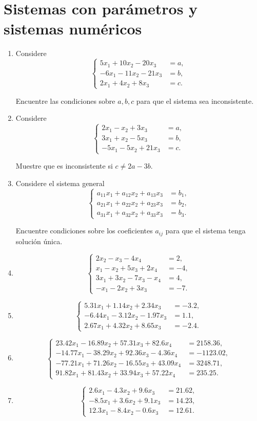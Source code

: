 \documentclass[12pt]{article}
\newcommand{\sistema}[1]{%
\[
\left\{
\begin{aligned}
#1
\end{aligned}
\right.
\]
}
\begin{document}
\section{Sistemas con parámetros y sistemas numéricos}

\begin{enumerate}[label=\textbf{\arabic*.},start=55,leftmargin=*]

\item Considere
\sistema{
5x_1+10x_2-20x_3&=a,\\
-6x_1-11x_2-21x_3&=b,\\
2x_1+4x_2+8x_3&=c.
}
Encuentre las condiciones sobre $a,b,c$ para que el sistema sea inconsistente.

\item Considere
\sistema{
2x_1-x_2+3x_3&=a,\\
3x_1+x_2-5x_3&=b,\\
-5x_1-5x_2+21x_3&=c.
}
Muestre que es inconsistente si $c\neq 2a-3b$.

\item Considere el sistema general
\sistema{
a_{11}x_1+a_{12}x_2+a_{13}x_3&=b_1,\\
a_{21}x_1+a_{22}x_2+a_{23}x_3&=b_2,\\
a_{31}x_1+a_{32}x_2+a_{33}x_3&=b_3.
}
Encuentre condiciones sobre los coeficientes $a_{ij}$ para que el sistema tenga solución única.

\item \sistema{
2x_2-x_3-4x_4&=2,\\
x_1-x_2+5x_3+2x_4&=-4,\\
3x_1+3x_2-7x_3-x_4&=4,\\
-x_1-2x_2+3x_3&=-7.
}

\item \sistema{
5.31x_1+1.14x_2+2.34x_3&=-3.2,\\
-6.44x_1-3.12x_2-1.97x_3&=1.1,\\
2.67x_1+4.32x_2+8.65x_3&=-2.4.
}

\item \sistema{
23.42x_1-16.89x_2+57.31x_3+82.6x_4&=2158.36,\\
-14.77x_1-38.29x_2+92.36x_3-4.36x_4&=-1123.02,\\
-77.21x_1+71.26x_2-16.55x_3+43.09x_4&=3248.71,\\
91.82x_1+81.43x_2+33.94x_3+57.22x_4&=235.25.
}

\item \sistema{
2.6x_1-4.3x_2+9.6x_3&=21.62,\\
-8.5x_1+3.6x_2+9.1x_3&=14.23,\\
12.3x_1-8.4x_2-0.6x_3&=12.61.
}


\end{enumerate}
\end{document}
